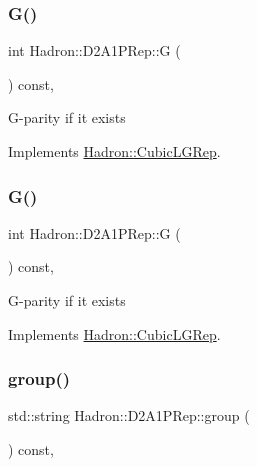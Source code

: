 \subsubsection{\texorpdfstring{G()}{G()}\hspace{0.1cm}{\footnotesize\ttfamily [2/3]}}
{\footnotesize\ttfamily int Hadron\+::\+D2\+A1\+P\+Rep\+::G (\begin{DoxyParamCaption}{ }\end{DoxyParamCaption}) const\hspace{0.3cm}{\ttfamily [inline]}, {\ttfamily [virtual]}}

G-\/parity if it exists 

Implements \mbox{\hyperlink{structHadron_1_1CubicLGRep_ace26f7b2d55e3a668a14cb9026da5231}{Hadron\+::\+Cubic\+L\+G\+Rep}}.

\mbox{\label{structHadron_1_1D2A1PRep_a624a76654139bb65156e67aeb663c84c}} 
\subsubsection{\texorpdfstring{G()}{G()}\hspace{0.1cm}{\footnotesize\ttfamily [3/3]}}
{\footnotesize\ttfamily int Hadron\+::\+D2\+A1\+P\+Rep\+::G (\begin{DoxyParamCaption}{ }\end{DoxyParamCaption}) const\hspace{0.3cm}{\ttfamily [inline]}, {\ttfamily [virtual]}}

G-\/parity if it exists 

Implements \mbox{\hyperlink{structHadron_1_1CubicLGRep_ace26f7b2d55e3a668a14cb9026da5231}{Hadron\+::\+Cubic\+L\+G\+Rep}}.

\mbox{\label{structHadron_1_1D2A1PRep_a202c6828bea0a6048053c70ddf7ea474}} 
\subsubsection{\texorpdfstring{group()}{group()}\hspace{0.1cm}{\footnotesize\ttfamily [1/3]}}
{\footnotesize\ttfamily std\+::string Hadron\+::\+D2\+A1\+P\+Rep\+::group (\begin{DoxyParamCaption}{ }\end{DoxyParamCaption}) const\hspace{0.3cm}{\ttfamily [inline]}, {\ttfamily [virtual]}}

